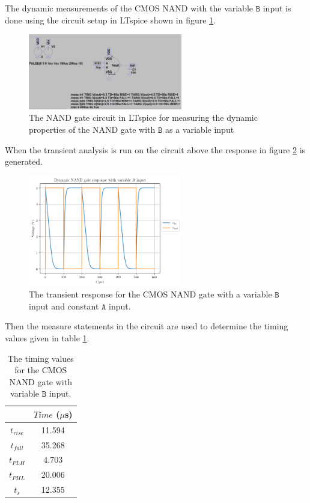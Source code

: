 \documentclass[titlepage, 12pt]{article}
\newcommand\sA{\ensuremath{\mathtt{A}}}
\newcommand\sB{\ensuremath{\mathtt{B}}}
\begin{document}
    The dynamic measurements of the CMOS NAND with the variable $\sB$ input
    is done using the circuit setup in LTspice shown in figure
    \ref{fig:part_22_NAND_B_circuit}.
    \begin{figure}[H]
        \centering
        \includegraphics[width=0.6\textwidth]
        {figures/part_22_NAND_B_circuit.png}
        \caption{The NAND gate circuit in LTspice for measuring the
            dynamic properties of the NAND gate with $\sB$ as a variable
        input}
        \label{fig:part_22_NAND_B_circuit}
    \end{figure}
    When the transient analysis is run on the circuit above the response
    in figure \ref{fig:part_22_NAND_B} is generated.
    \begin{figure}[H]
        \centering
        \includegraphics[width=0.6\textwidth]{figures/part_22_NAND_B.png}
        \caption{The transient response for the CMOS NAND gate with a
        variable $\sB$ input and constant $\sA$ input.}
        \label{fig:part_22_NAND_B}
    \end{figure}
    Then the measure statements in the circuit are used to determine the
    timing values given in table \ref{tab:NAND_B_time}.
    \begin{table}[H]
        \centering
        \caption{The timing values for the CMOS NAND gate with variable
        $\sB$ input.}
        \label{tab:NAND_B_time}
        \begin{tabular}{c|c}
            & $Time$ ($\mu$s)\\
            \hline
            $t_{rise}$ & 11.594\\
            $t_{fall}$ & 35.268\\
            $t_{PLH}$ & 4.703\\
            $t_{PHL}$ & 20.006\\
            $t_s$ & 12.355\\
        \end{tabular}
    \end{table}
\end{document}
